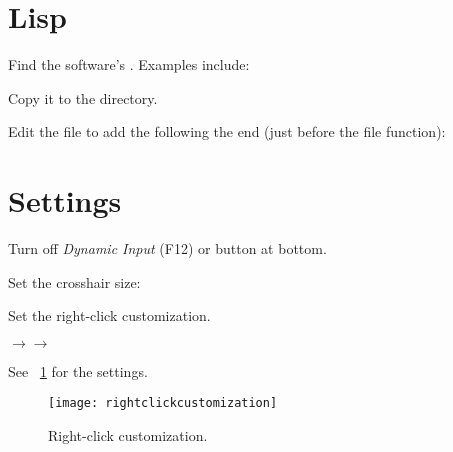 \section{Lisp}
\begin{numberedlist}
    \item Find the software's .  Examples include:
    \begin{bulletedlist}
    	\item {}
    	\item {}
    	\item {}
    \end{bulletedlist}
    \item Copy it to the \supportdir{} directory.
    \item Edit the file to add the following the end (just before the file  function):
    \begin{plainlist}
    	\item {}
		\item {}
    \end{plainlist}

\end{numberedlist}


\section{Settings}
\begin{bulletedlist}
	\item Turn off \textit{Dynamic Input} (F12) or button at bottom.
	\item Set the crosshair size: 
	\item Set the right-click customization.
	\begin{numberedlist}
		\item {}$\rightarrow$$\rightarrow$
		\item See \figurename~\ref{fig:rightclickcustomization} for the settings.
	\end{numberedlist}
\end{bulletedlist}

\begin{figure}
	\centering
	\texttt{[image: rightclickcustomization]}
	\caption{Right-click customization.}
	\label{fig:rightclickcustomization}
\end{figure}


